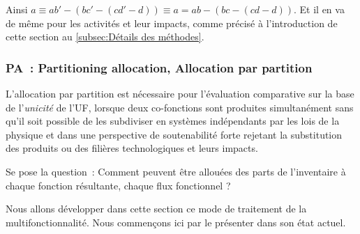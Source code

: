 Ainsi
$
a \equiv ab' -(bc' -(cd' - d))\equiv a = ab -(bc -(cd - d))
$.
Et il en va de même pour les activités et leur impacts, comme précisé à l'introduction de cette section au \ref{subsec:Détails des méthodes}.

\subsubsection{PA~: Partitioning allocation, Allocation par partition}
L'allocation par partition est nécessaire pour l'évaluation comparative sur la base de l'\emph{unicité} de l'\gls{UF}, lorsque deux co-fonctions sont produites simultanément sans qu'il soit possible de les subdiviser en systèmes indépendants par les lois de la physique et dans une perspective de soutenabilité forte rejetant la substitution des produits ou des filières technologiques et leurs impacts.

Se pose la question~: Comment peuvent être allouées des parts de l'inventaire à chaque fonction résultante, chaque flux fonctionnel ?

Nous allons développer dans cette section ce mode de traitement de la multifonctionnalité.
Nous commençons ici par le présenter dans son état actuel.

